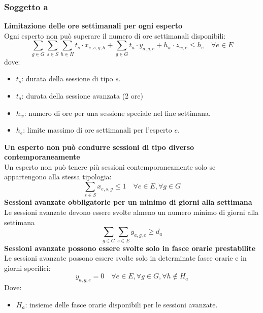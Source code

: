 \documentclass[12pt]{article}
\begin{document}
    \subsubsection{Soggetto a}
    \textbf{Limitazione delle ore settimanali per ogni esperto}\\
    Ogni esperto non può superare il numero di ore settimanali disponibili:
    \begin{equation}
        \sum_{g \in G}\sum_{s \in S}\sum_{h \in H} t_s \cdot x_{e,s,g,h} + \sum_{g \in G} t_a \cdot y_{a,g,e} + h_w \cdot z_{w,e} \leq h_{e} \quad \forall e \in E
    \end{equation}
    dove:
    \begin{itemize}
        \item $t_s$: durata della sessione di tipo $s$.
        \item $t_a$: durata della sessione avanzata (2 ore)
        \item $h_w$: numero di ore per una sessione speciale nel fine settimana.
        \item $h_e$: limite massimo di ore settimanali per l'esperto $e$.
    \end{itemize}
    \textbf{Un esperto non può condurre sessioni di tipo diverso contemporaneamente}\\
    Un esperto non può tenere più sessioni contemporaneamente solo se appartengono alla stessa tipologia:
    \begin{equation}
        \sum_{s \in S} x_{e,s,g} \leq 1 \quad \forall e \in E, \forall g \in G
    \end{equation}
    \textbf{Sessioni avanzate obbligatorie per un minimo di giorni alla settimana}\\
    Le sessioni avanzate devono essere svolte almeno un numero minimo di giorni alla settimana
    \begin{equation}
        \sum_{g \in G} \sum_{e \in E} y_{a,g,e} \geq d_a
    \end{equation}
    \textbf{Sessioni avanzate possono essere svolte solo in fasce orarie prestabilite}\\
    Le sessioni avanzate possono essere svolte solo in determinate fasce orarie e in giorni specifici:
    \begin{equation}
        y_{a,g,e} = 0 \quad \forall e \in E, \forall g \in G, \forall h \notin H_a
    \end{equation}
    Dove:
    \begin{itemize}
        \item $H_a$: insieme delle fasce orarie disponibili per le sessioni avanzate.
    \end{itemize}
\end{document}
